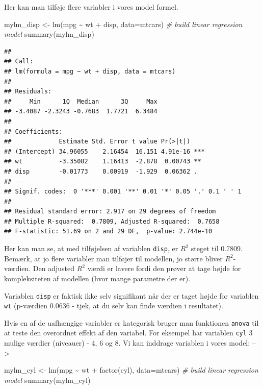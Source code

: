 \documentclass[
]{book}
\newenvironment{Shaded}{\begin{snugshade}}{\end{snugshade}}
\newcommand{\AttributeTok}[1]{\textcolor[rgb]{0.77,0.63,0.00}{#1}}
\newcommand{\CommentTok}[1]{\textcolor[rgb]{0.56,0.35,0.01}{\textit{#1}}}
\newcommand{\FunctionTok}[1]{\textcolor[rgb]{0.00,0.00,0.00}{#1}}
\newcommand{\NormalTok}[1]{#1}
\newcommand{\OtherTok}[1]{\textcolor[rgb]{0.56,0.35,0.01}{#1}}
\newcommand{\SpecialCharTok}[1]{\textcolor[rgb]{0.00,0.00,0.00}{#1}}
\begin{document}
Her kan man tilføje flere variabler i vores model formel.

\begin{Shaded}
\begin{Highlighting}[]
\NormalTok{mylm\_disp }\OtherTok{\textless{}{-}} \FunctionTok{lm}\NormalTok{(mpg }\SpecialCharTok{\textasciitilde{}}\NormalTok{ wt }\SpecialCharTok{+}\NormalTok{ disp, }\AttributeTok{data=}\NormalTok{mtcars) }\CommentTok{\# build linear regression model}
\FunctionTok{summary}\NormalTok{(mylm\_disp)}
\end{Highlighting}
\end{Shaded}

\begin{verbatim}
## 
## Call:
## lm(formula = mpg ~ wt + disp, data = mtcars)
## 
## Residuals:
##     Min      1Q  Median      3Q     Max 
## -3.4087 -2.3243 -0.7683  1.7721  6.3484 
## 
## Coefficients:
##             Estimate Std. Error t value Pr(>|t|)    
## (Intercept) 34.96055    2.16454  16.151 4.91e-16 ***
## wt          -3.35082    1.16413  -2.878  0.00743 ** 
## disp        -0.01773    0.00919  -1.929  0.06362 .  
## ---
## Signif. codes:  0 '***' 0.001 '**' 0.01 '*' 0.05 '.' 0.1 ' ' 1
## 
## Residual standard error: 2.917 on 29 degrees of freedom
## Multiple R-squared:  0.7809, Adjusted R-squared:  0.7658 
## F-statistic: 51.69 on 2 and 29 DF,  p-value: 2.744e-10
\end{verbatim}

Her kan man se, at med tilføjelsen af variablen \texttt{disp}, er \(R^2\) steget til 0.7809. Bemærk, at jo flere variabler man tilføjer til modellen, jo større bliver \(R^2\)-værdien. Den adjusted \(R^2\) værdi er lavere fordi den prøver at tage højde for kompleksiteten af modellen (hvor mange parametre der er).

Variablen \texttt{disp} er faktisk ikke selv signifikant når der er taget højde for variablen \texttt{wt} (p-værdien 0.0636 - tjek, at du selv kan finde værdien i resultatet).

Hvis en af de uafhængige variabler er kategorisk bruger man funktionen \texttt{anova} til at teste den overordnet effekt af den variabel. For eksempel har variablen \texttt{cyl} 3 mulige værdier (niveauer) - 4, 6 og 8. Vi kan inddrage variablen i vores model: --\textgreater{}

\begin{Shaded}
\begin{Highlighting}[]
\NormalTok{mylm\_cyl }\OtherTok{\textless{}{-}} \FunctionTok{lm}\NormalTok{(mpg }\SpecialCharTok{\textasciitilde{}}\NormalTok{ wt }\SpecialCharTok{+} \FunctionTok{factor}\NormalTok{(cyl), }\AttributeTok{data=}\NormalTok{mtcars) }\CommentTok{\# build linear regression model}
\FunctionTok{summary}\NormalTok{(mylm\_cyl)}
\end{Highlighting}
\end{Shaded}
\end{document}
